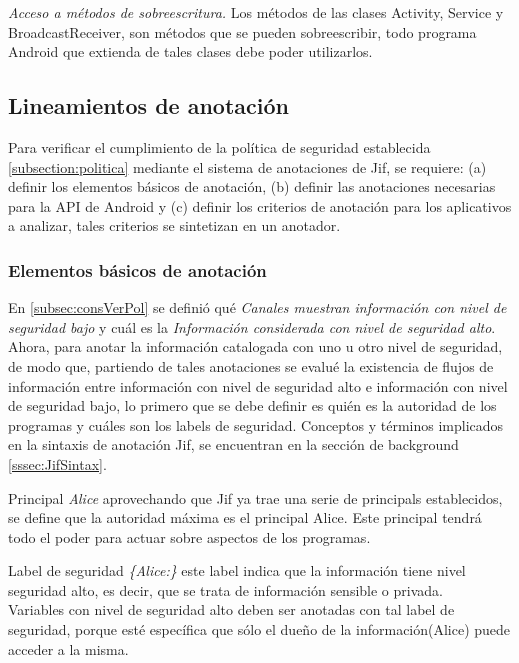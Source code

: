 \textit{Acceso a métodos de sobreescritura.}\newline
Los métodos de las clases Activity, Service y BroadcastReceiver, son métodos
que se pueden sobreescribir, todo programa Android que extienda de tales clases
debe poder utilizarlos.

\subsection{Lineamientos de anotación}
\label{subsec:linemientos}
Para verificar el cumplimiento de la política de seguridad
establecida \ref{subsection:politica} mediante el sistema de anotaciones de Jif,
se requiere: (a) definir los elementos básicos de anotación, (b) definir
las anotaciones necesarias para la API de Android y (c) definir los
criterios de anotación para los aplicativos a analizar, tales 
criterios se sintetizan en un anotador.

\subsubsection{Elementos básicos de anotación}
En \ref{subsec:consVerPol} se definió qué \textit{Canales muestran
información con nivel de seguridad bajo} y cuál es la \textit{Información
considerada con nivel de seguridad alto}. Ahora, para anotar la información
catalogada con uno u otro nivel de seguridad, de modo que, partiendo de tales
anotaciones se evalué la existencia de flujos de información entre información
con nivel de seguridad alto e información con nivel de seguridad bajo, lo primero
que se debe definir es quién es la autoridad de los programas y cuáles son los
labels de seguridad.\newline
Conceptos y términos implicados en la sintaxis de anotación Jif, se
encuentran en la sección de background \ref{sssec:JifSintax}.

Principal \emph{Alice}\newline
aprovechando que Jif ya trae una serie de principals establecidos, se define que
la autoridad máxima es el principal Alice. Este principal tendrá todo el poder
para actuar sobre aspectos de los programas.

Label de seguridad \emph{\{Alice:\}}\newline
este label indica que la información tiene nivel seguridad alto, es decir, que
se trata de información sensible o privada.\\
Variables con nivel de seguridad alto deben ser anotadas con tal label de
seguridad, porque esté específica que sólo el dueño de la información(Alice)
puede acceder a la misma. 

